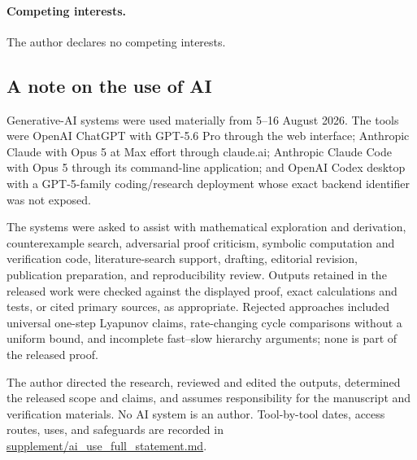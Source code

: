\paragraph{Competing interests.}
The author declares no competing interests.

\subsection*{A note on the use of AI}
Generative-AI systems were used materially from 5--16 August 2026.  The tools
were OpenAI ChatGPT with GPT-5.6 Pro through the web interface; Anthropic
Claude with Opus 5 at Max effort through claude.ai; Anthropic Claude Code with
Opus 5 through its command-line application; and OpenAI Codex desktop with a
GPT-5-family coding/research deployment whose exact backend identifier was not
exposed.

The systems were asked to assist with mathematical exploration and derivation,
counterexample search, adversarial proof criticism, symbolic computation and
verification code, literature-search support, drafting, editorial revision,
publication preparation, and reproducibility review.  Outputs retained in the
released work were checked against the displayed proof, exact calculations and
tests, or cited primary sources, as appropriate.  Rejected approaches included universal
one-step Lyapunov claims, rate-changing cycle comparisons without a uniform
bound, and incomplete fast--slow hierarchy arguments; none is part of the
released proof.

The author directed the research, reviewed and edited the outputs, determined
the released scope and claims, and assumes responsibility for the manuscript
and verification materials.  No AI system is an author.  Tool-by-tool dates,
access routes, uses, and safeguards are recorded in
\href{https://github.com/AlecKriebel/Math/blob/bimolecular-positive-recurrence-v1.2.1/bimolecular_positive_recurrence_submission_v1_2_1/supplement/ai_use_full_statement.md}{supplement/ai\_use\_full\_statement.md}.



